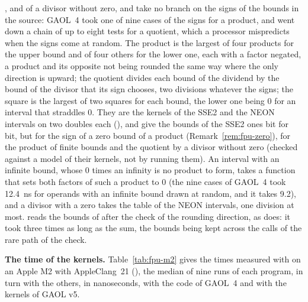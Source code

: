 \documentclass[12pt,a4paper,twoside,openright]{book}
\begin{document}
\medskip
{},  and  of a divisor without zero, and
 take no branch on the signs of the bounds in the
source:\newinvfive{} GAOL~4 took one of nine cases of the signs for a
product, and went down a chain of up to eight tests for a quotient, which a
processor mispredicts when the signs come at random. The product is the
largest of four products for the upper bound and of four others for the lower
one, each with a factor negated, a product and its opposite not being rounded
the same way where the only direction is upward; the quotient divides each
bound of the dividend by the bound of the divisor that its sign chooses, two
divisions whatever the signs; the square is the largest of two squares for
each bound, the lower one being 0 for an interval that straddles 0. They are
the kernels of the SSE2 and the NEON intervals on two doubles each
(), and give the bounds of the SSE2 ones bit for bit, but
for the sign of a zero bound of a product (Remark~\ref{rem:fpu-zero}), for
the product of finite bounds and the quotient by a divisor without zero
(checked against a model of their kernels, not by running them). An interval
with an infinite bound, whose 0 times an infinity is no product to form,
takes a function that sets both factors of such a product to 0 (the nine
cases of GAOL~4 took 12.4~ns for operands with an infinite bound drawn at
random, and it takes 9.2), and a divisor with a zero takes the table of the
NEON intervals, one division at most.  reads the bounds of
 after the check of the rounding direction, as  does: it
took three times as long as the sum, the bounds being kept across the calls
of the rare path of the check.

\medskip
\noindent
\textbf{The time of the kernels.} Table~\ref{tab:fpu-m2} gives the times
measured with  on an Apple M2 with AppleClang~21
(), the median of nine runs of each program, in turn
with the others, in nanoseconds, with the code of GAOL~4 and with the kernels
of GAOL v5.
\end{document}
